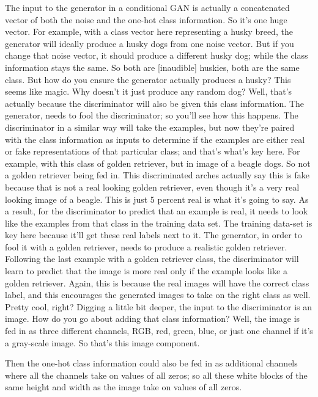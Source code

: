 \documentclass[11pt, onecolumn]{article}
\begin{document}
The input to the generator in a conditional GAN is actually a concatenated vector of both the noise and the one-hot class information.
So it's one huge vector.
For example, with a class vector
here representing a husky breed,
the generator will ideally produce
a husky dogs from one noise vector.
But if you change that noise vector,
it should produce a different husky dog;
while the class information stays the same.
So both are [inaudible] huskies,
both are the same class.
But how do you ensure
the generator actually produces a husky?
This seems like magic.
Why doesn't it just produce any random dog?
Well, that's actually because
the discriminator will also
be given this class information.
The generator, needs to fool the discriminator;
so you'll see how this happens.
The discriminator in a similar way
will take the examples,
but now they're paired with the class information as
inputs to determine if the examples are
either real or fake representations
of that particular class;
and that's what's key here.
For example, with this class of golden retriever,
but in image of a beagle dogs.
So not a golden retriever being fed in.
This discriminated arches actually say this is
fake because that is not a real looking golden retriever,
even though it's a very real looking image of a beagle.
This is just 5 percent real is what it's going to say.
As a result, for the discriminator to
predict that an example is real,
it needs to look like the examples
from that class in the training data set.
The training data-set is key here because it'll
get these real labels next to it.
The generator, in order to
fool it with a golden retriever,
needs to produce a realistic golden retriever.
Following the last example with a golden retriever class,
the discriminator will learn to predict that the image is
more real only if
the example looks like a golden retriever.
Again, this is because
the real images will have the correct class label,
and this encourages the generated images to take on
the right class as well. Pretty cool, right?
Digging a little bit deeper,
the input to the discriminator is an image.
How do you go about adding that class information?
Well, the image is fed in as three different channels,
RGB, red, green, blue,
or just one channel if it's a gray-scale image.
So that's this image component.

Then the one-hot class information could also be fed in as additional channels where all the channels take on values of all zeros; so all these white blocks of the same height and width as the image take on values of all zeros.
\end{document}
